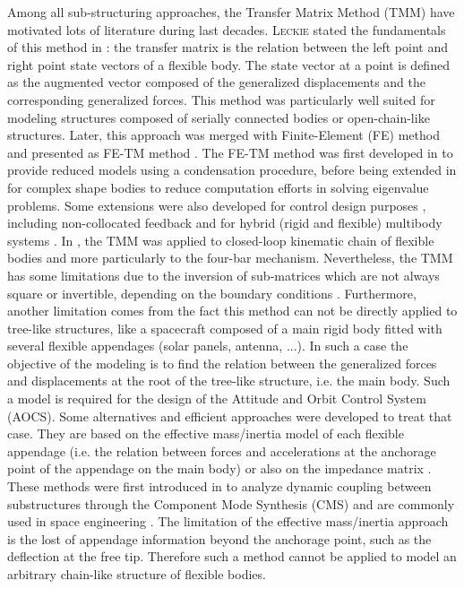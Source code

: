 \documentclass[smallcondensed]{svjour3}     %
\begin{document}
Among all sub-structuring approaches, the Transfer Matrix Method (TMM) have motivated lots of literature during last decades. \textsc{Leckie} stated the fundamentals of this method in \cite{Leckie}: the transfer matrix is the relation between the left point and right point state vectors of a flexible body. The state vector at a point is defined as the augmented vector composed of the generalized displacements and the corresponding generalized forces. This method was particularly well suited for modeling structures composed of serially connected bodies or open-chain-like structures. Later, this approach was merged with Finite-Element (FE) method and presented as FE-TM method \cite{Dokainish1972}. The FE-TM method was first developed in \cite{Mucino1981} to provide reduced models  using a condensation procedure, before being extended in \cite{Rong2010} for complex shape bodies to reduce computation efforts in solving eigenvalue problems.  Some extensions were also developed for control design purposes \cite{TAN199047}, including non-collocated feedback \cite{Krauss2010} and for hybrid (rigid and flexible) multibody systems \cite{Rui2008}. In \cite{Kitis1990267}, the TMM was applied to  closed-loop kinematic chain of flexible bodies and more particularly to the four-bar mechanism. Nevertheless, the TMM has some limitations due to the inversion of sub-matrices which are not always square or invertible, depending on the boundary conditions \cite{TAN199047}. Furthermore, another limitation comes from the fact this method can not be directly applied to tree-like structures, %
like a spacecraft composed of a main rigid body fitted with several flexible appendages (solar panels, antenna, ...).
In such a  case the objective of the modeling is to find the relation  between the generalized forces and displacements at the root of the tree-like structure, i.e. the main body. Such a model is required for the design of the Attitude and Orbit Control System (AOCS). Some alternatives and efficient approaches were developed to treat that case. They are based on the effective mass/inertia model of each flexible appendage (i.e. the relation between forces and accelerations at the anchorage point of the appendage on the main body) \cite{Girard} or also on the impedance matrix \cite{1988CeMec,Sylla208}. These methods were first introduced in \cite{craig1977substructure} to analyze dynamic coupling between substructures through the Component Mode Synthesis (CMS) and are commonly used in space engineering \cite{oatao11016}. The limitation of the effective mass/inertia approach is the lost of appendage information beyond the anchorage point, such as the deflection at the free tip. Therefore such a method cannot be applied to model an arbitrary chain-like structure of flexible bodies. 
\end{document}
